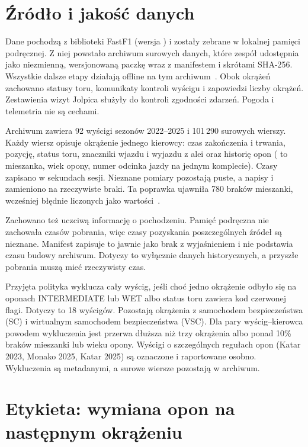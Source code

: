 \label{ch:data}

\section{Źródło i jakość danych}

Dane pochodzą z biblioteki FastF1 (wersja ) i zostały zebrane
w lokalnej pamięci podręcznej. Z niej powstało archiwum surowych danych,
które zespół udostępnia jako niezmienną, wersjonowaną paczkę wraz
z manifestem i skrótami SHA-256. Wszystkie dalsze etapy działają offline
na tym archiwum~\cite{datav1}. Obok okrążeń zachowano statusy toru,
komunikaty kontroli wyścigu i zapowiedzi liczby okrążeń. Zestawienia
wizyt Jolpica służyły do kontroli zgodności zdarzeń. Pogoda i telemetria
nie są cechami.

Archiwum zawiera 92 wyścigi sezonów 2022--2025 i 101\,290 surowych
wierszy. Każdy wiersz opisuje okrążenie jednego kierowcy: czas zakończenia
i trwania, pozycję, status toru, znaczniki wjazdu i wyjazdu z alei oraz
historię opon ( to mieszanka,  wiek opony,
 numer odcinka jazdy na jednym komplecie). Czasy zapisano
w sekundach sesji. Nieznane pomiary pozostają puste, a napisy 
i  zamieniono na rzeczywiste braki. Ta poprawka ujawniła 780
braków mieszanki, wcześniej błędnie liczonych jako wartości~\cite{findings}.

Zachowano też uczciwą informację o pochodzeniu. Pamięć podręczna nie
zachowała czasów pobrania, więc czasy pozyskania poszczególnych źródeł są
nieznane. Manifest zapisuje to jawnie jako brak z wyjaśnieniem
i nie podstawia czasu budowy archiwum. Dotyczy to wyłącznie danych
historycznych, a przyszłe pobrania muszą mieć rzeczywisty czas.

Przyjęta polityka wyklucza cały wyścig, jeśli choć jedno okrążenie
odbyło się na oponach INTERMEDIATE lub WET albo status toru zawiera kod
czerwonej flagi. Dotyczy to 18 wyścigów. Pozostają okrążenia z samochodem
bezpieczeństwa (SC) i wirtualnym samochodem bezpieczeństwa (VSC). Dla pary
wyścig--kierowca powodem wykluczenia jest przerwa dłuższa niż trzy
okrążenia albo ponad 10\% braków mieszanki lub wieku opony. Wyścigi
o szczególnych regułach opon (Katar 2023, Monako 2025, Katar 2025) są
oznaczone i raportowane osobno. Wykluczenia są metadanymi, a surowe wiersze
pozostają w archiwum.

\section{Etykieta: wymiana opon na następnym okrążeniu}

